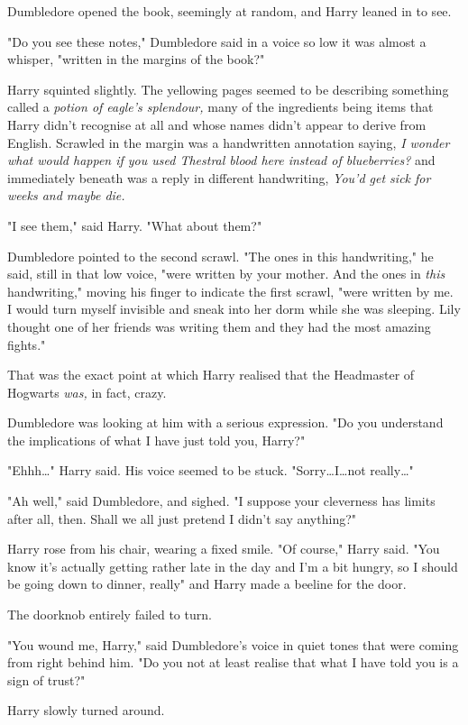 Dumbledore opened the book, seemingly at random, and Harry leaned in to see.

"Do you see these notes," Dumbledore said in a voice so low it was almost a
whisper, "written in the margins of the book?"

Harry squinted slightly. The yellowing pages seemed to be describing something
called a \emph{potion of eagle’s splendour,} many of the ingredients being
items that Harry didn’t recognise at all and whose names didn’t appear to
derive from English. Scrawled in the margin was a handwritten annotation
saying, \emph{I wonder what would happen if you used Thestral blood here
instead of blueberries?} and immediately beneath was a reply in different
handwriting, \emph{You’d get sick for weeks and maybe die.}

"I see them," said Harry. "What about them?"

Dumbledore pointed to the second scrawl. "The ones in this handwriting," he
said, still in that low voice, "were written by your mother. And the ones in
\emph{this} handwriting," moving his finger to indicate the first scrawl, "were
written by me. I would turn myself invisible and sneak into her dorm while
she was sleeping. Lily thought one of her friends was writing them and they had
the most amazing fights."

That was the exact point at which Harry realised that the Headmaster of
Hogwarts \emph{was,} in fact, crazy.

Dumbledore was looking at him with a serious expression. "Do you understand the
implications of what I have just told you, Harry?"

"Ehhh…" Harry said. His voice seemed to be stuck. "Sorry…I…not really…"

"Ah well," said Dumbledore, and sighed. "I suppose your cleverness has limits
after all, then. Shall we all just pretend I didn’t say anything?"

Harry rose from his chair, wearing a fixed smile. "Of course," Harry said. "You
know it’s actually getting rather late in the day and I’m a bit hungry, so I
should be going down to dinner, really" and Harry made a beeline for the door.

The doorknob entirely failed to turn.

"You wound me, Harry," said Dumbledore’s voice in quiet tones that were coming
from right behind him. "Do you not at least realise that what I have told you
is a sign of trust?"

Harry slowly turned around.

